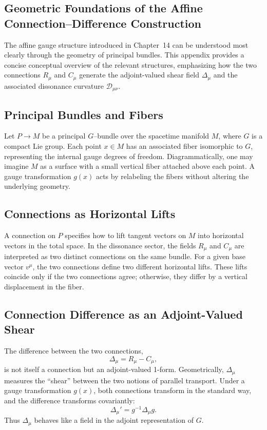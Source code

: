 \documentclass[12pt,openany]{book}
\theoremstyle{plain}
\theoremstyle{definition}
\theoremstyle{remark}
\begin{document}
\subsection{Geometric Foundations of the Affine Connection--Difference Construction}

The affine gauge structure introduced in Chapter~14 can be understood most
clearly through the geometry of principal bundles. This appendix provides a
concise conceptual overview of the relevant structures, emphasizing how the
two connections $R_\mu$ and $C_\mu$ generate the adjoint-valued shear field
$\Delta_\mu$ and the associated dissonance curvature $\mathcal{D}_{\mu\nu}$.

\subsection*{Principal Bundles and Fibers}

Let $P \to M$ be a principal $G$--bundle over the spacetime manifold $M$,
where $G$ is a compact Lie group. Each point $x \in M$ has an associated
fiber isomorphic to $G$, representing the internal gauge degrees of freedom.
Diagrammatically, one may imagine $M$ as a surface with a small vertical
fiber attached above each point. A gauge transformation $g(x)$ acts by
relabeling the fibers without altering the underlying geometry.

\subsection*{Connections as Horizontal Lifts}

A connection on $P$ specifies how to lift tangent vectors on $M$ into
horizontal vectors in the total space. In the dissonance sector, the fields
$R_\mu$ and $C_\mu$ are interpreted as two distinct connections on the same
bundle. For a given base vector $v^\mu$, the two connections define two
different horizontal lifts. These lifts coincide only if the two connections
agree; otherwise, they differ by a vertical displacement in the fiber.

\subsection*{Connection Difference as an Adjoint-Valued Shear}

The difference between the two connections,
\[
\Delta_\mu = R_\mu - C_\mu,
\]
is not itself a connection but an adjoint-valued 1-form. Geometrically,
$\Delta_\mu$ measures the ``shear'' between the two notions of parallel
transport. Under a gauge transformation $g(x)$, both connections transform
in the standard way, and the difference transforms covariantly:
\[
\Delta_\mu' = g^{-1} \Delta_\mu g.
\]
Thus $\Delta_\mu$ behaves like a field in the adjoint representation of $G$.
\end{document}
